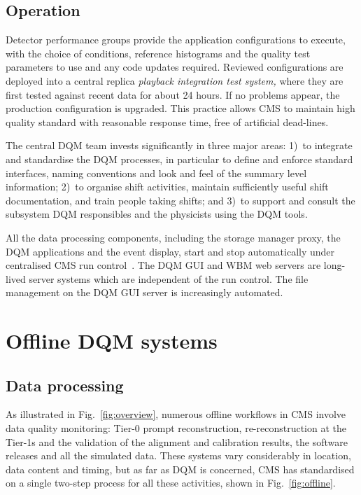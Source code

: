 \documentclass[a4paper]{jpconf}
\begin{document}
\subsection{Operation}

Detector performance groups provide the application configurations to execute,
with the choice of conditions, reference histograms and the quality test
parameters to use and any code updates required.  Reviewed configurations are
deployed into a central replica {\em playback integration test system,} where
they are first tested against recent data for about 24 hours.  If no problems
appear, the production configuration is upgraded.  This practice allows CMS to
maintain high quality standard with reasonable response time, free of
artificial dead-lines.

The central DQM team invests significantly in three major areas: 1)~to
integrate and standardise the DQM processes, in particular to define and
enforce standard interfaces, naming conventions and look and feel of the
summary level information; 2)~to organise shift activities, maintain
sufficiently useful shift documentation, and train people taking shifts; and
3)~to support and consult the subsystem DQM responsibles and the physicists
using the DQM tools.

All the data processing components, including the storage manager proxy, the
DQM applications and the event display, start and stop automatically under
centralised CMS run control~\cite{runcontrol}.  The DQM GUI and WBM web
servers are long-lived server systems which are independent of the run
control.  The file management on the DQM GUI server is increasingly automated.


\section{Offline DQM systems}
\subsection{Data processing}

As illustrated in Fig.~\ref{fig:overview}, numerous offline workflows in CMS
involve data quality monitoring: Tier-0 prompt reconstruction,
re-reconstruction at the Tier-1s and the validation of the alignment and
calibration results, the software releases and all the simulated data.  These
systems vary considerably in location, data content and timing, but as far as
DQM is concerned, CMS has standardised on a single two-step process for all
these activities, shown in Fig.~\ref{fig:offline}.
\end{document}
